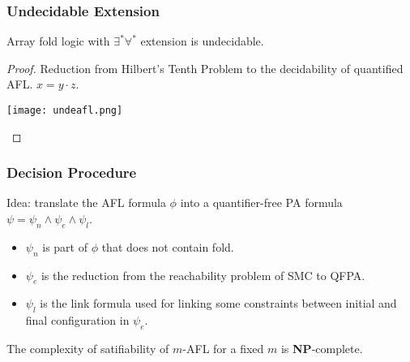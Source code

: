 \documentclass[11pt]{beamer}
\begin{document}
\begin{frame}\frametitle{Undecidable Extension}
\begin{theorem}
Array fold logic with $\exists^*\forall^*$ extension is undecidable. 
\end{theorem}

\begin{proof}
Reduction from Hilbert's Tenth Problem to the decidability of quantified AFL. $x = y\cdot z$.
\begin{center}

\texttt{[image: undeafl.png]}

\end{center}
\end{proof}
\end{frame}

\begin{frame}\frametitle{Decision Procedure}
Idea: translate the AFL formula $\phi$ into a quantifier-free PA formula $\psi = \psi_n \wedge \psi_e \wedge \psi_l$.

\begin{itemize}
\item $\psi_n$ is part of $\phi$ that does not contain fold.
\item $\psi_e$ is the reduction from the reachability problem of SMC to QFPA.
\item $\psi_l$ is the link formula used for linking some constraints between initial and final configuration in $\psi_e$.
\end{itemize}

\begin{lemma}
The complexity of satifiability of $m$-AFL for a fixed $m$ is \textbf{NP}-complete.
\end{lemma}

\end{frame}
\end{document}
